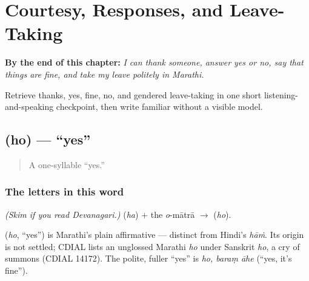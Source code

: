 
\chapter{Courtesy, Responses, and Leave-Taking}
\label{ch:greetings}

\begin{chapteropening}
\textbf{By the end of this chapter:} \emph{I can thank someone, answer yes or no, say that things are fine, and take my leave politely in Marathi.}

Retrieve thanks, yes, fine, no, and gendered leave-taking in one short listening-and-speaking checkpoint, then write familiar  without a visible model.
\end{chapteropening}

\section[\texorpdfstring{\mr{हो} (ho)}{हो (ho)}]{ (ho) — \textquotedblleft{}yes\textquotedblright{}}

\label{lesson:MR-C01-ho}



\begin{quote}
A one-syllable \textquotedblleft{}yes.\textquotedblright{}
\end{quote}

\subsection*{The letters in this word}
\emph{(Skim if you read Devanagari.)} \textbf{} (\emph{ha}) + the \emph{o}-mātrā \textbf{} $\to$ \textbf{} (\emph{ho}).

\begin{cousinweb}
\textbf{} (\emph{ho}, \textquotedblleft{}yes\textquotedblright{}) is Marathi's plain affirmative — distinct from Hindi's \emph{hāṁ}. Its origin is not settled; CDIAL lists an unglossed Marathi \emph{ho} under Sanskrit \emph{ho}, a cry of summons (CDIAL 14172). The polite, fuller \textquotedblleft{}yes\textquotedblright{} is \emph{ho, baraṃ āhe} (\textquotedblleft{}yes, it's fine\textquotedblright{}).
\end{cousinweb}

